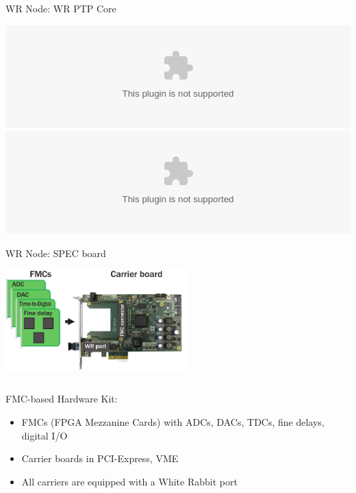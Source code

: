 \documentclass[compress,red]{beamer}
\begin{document}
\begin{frame}{WR Node: WR PTP Core}

    \begin{center}
    \includegraphics<1>[width=1.0\textwidth]{../../figures/node/wrpc_box.eps} \pause
    \includegraphics<2>[width=1.0\textwidth]{../../figures/node/wrpc_inside.eps}
    \end{center}

\end{frame}
\begin{frame}{WR Node: SPEC board}

    \begin{center}
    \includegraphics[width=7cm]{../../figures/node/shw_kit-1}
    \end{center}

  \begin{columns}[c]

	\begin{block}{FMC-based Hardware Kit:}
	  \begin{itemize}
	  \item FMCs (FPGA Mezzanine Cards) with ADCs, DACs, TDCs, fine delays, digital I/O
	  \item Carrier boards in PCI-Express, VME
	  \item All carriers are equipped with a White Rabbit port
	  \end{itemize}
	\end{block}

  \end{columns}


\end{frame}
\end{document}
